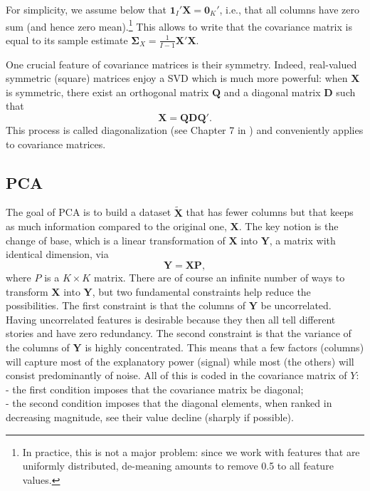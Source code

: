 \documentclass[]{krantz}
\let\rmarkdownfootnote\footnote%
\def\footnote{\protect\rmarkdownfootnote}
\theoremstyle{definition}
\theoremstyle{definition}
\theoremstyle{definition}
\theoremstyle{remark}
\begin{document}
For simplicity, we assume below that
\(\textbf{1}_I'\textbf{X}=\textbf{0}_K'\), i.e., that all columns have
zero sum (and hence zero mean).\footnote{In practice, this is not a
  major problem: since we work with features that are uniformly
  distributed, de-meaning amounts to remove 0.5 to all feature values.}
This allows to write that the covariance matrix is equal to its sample
estimate \(\boldsymbol{\Sigma}_X= \frac{1}{I-1}\textbf{X}'\textbf{X}\).

One crucial feature of covariance matrices is their symmetry. Indeed,
real-valued symmetric (square) matrices enjoy a SVD which is much more
powerful: when \(\textbf{X}\) is symmetric, there exist an orthogonal
matrix \(\textbf{Q}\) and a diagonal matrix \(\textbf{D}\) such that
\begin{equation}
\label{eq:diagonaliz} 
\textbf{X}=\textbf{Q}\textbf{DQ}'.
\end{equation} This process is called diagonalization (see Chapter 7 in
\citet{meyer2000matrix}) and conveniently applies to covariance
matrices.

\hypertarget{pca}{%
\subsection{PCA}\label{pca}}

The goal of PCA is to build a dataset \(\tilde{\textbf{X}}\) that has
fewer columns but that keeps as much information compared to the
original one, \(\textbf{X}\). The key notion is the change of base,
which is a linear transformation of \(\textbf{X}\) into \(\textbf{Y}\),
a matrix with identical dimension, via \[\textbf{Y}=\textbf{XP},\] where
\(P\) is a \(K \times K\) matrix. There are of course an infinite number
of ways to transform \(\textbf{X}\) into \(\textbf{Y}\), but two
fundamental constraints help reduce the possibilities. The first
constraint is that the columns of \(\textbf{Y}\) be uncorrelated. Having
uncorrelated features is desirable because they then all tell different
stories and have zero redundancy. The second constraint is that the
variance of the columns of \(\textbf{Y}\) is highly concentrated. This
means that a few factors (columns) will capture most of the explanatory
power (signal) while most (the others) will consist predominantly of
noise. All of this is coded in the covariance matrix of
\(\textit{Y}\):\\
- the first condition imposes that the covariance matrix be diagonal;\\
- the second condition imposes that the diagonal elements, when ranked
in decreasing magnitude, see their value decline (sharply if possible).
\end{document}

